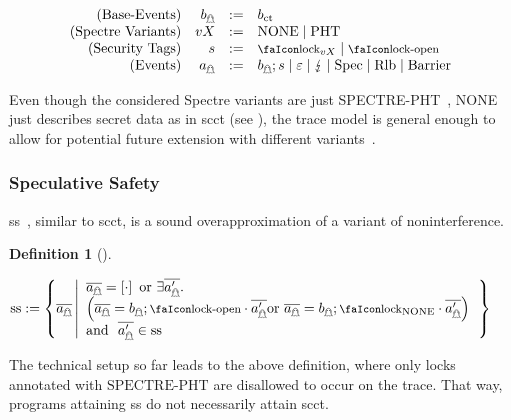 \documentclass[dvipsnames,conference]{IEEEtran}
\theoremstyle{definition}
\newtheorem{definition}{Definition}[section]
\begin{document}
\vspace{-1em}
{
\[
  \begin{array}{rrcl}
    (\text{Base-Events}) & \preevent[_{\mathghost}] &:=& \preevent[_{\ctsafe}] \\
    (\text{Spectre Variants}) & vX &:=& \operatorname{NONE} \mid \operatorname{PHT} \\
    (\text{Security Tags}) & \securitytag{} &:=& \lock_{vX} \mid \unlock\\ 
    (\text{Events}) & \event[_{\mathghost}] &:=& \preevent[_{\mathghost}];\securitytag{} \mid \emptyevent \mid \lightning \mid \ev{Spec} \mid \ev{Rlb} \mid \ev{Barrier}\\ 
  \end{array}
\]
}

Even though the considered Spectre variants are just SPECTRE-PHT~\cite{kocher2019spectre}, NONE just describes secret data as in \gls*{scct} (see ), the trace model is general enough to allow for potential future extension with different variants~\cite{kocher2019spectre,maisuradze2018ret2spec,horn2019zero}.

\subsubsection{Speculative Safety}

\gls*{ss}~\cite{patrignani2021exorcising}, similar to \gls*{scct}, is a sound overapproximation of a variant of noninterference.

\begin{definition}[]\label{def:trace:ss}
  \noindent

  \begin{nscenter}
  $
    \sssafe:=\left\{\trace[_{\mathghost}] \left|\begin{array}{l}
      \trace[_{\mathghost}]=\hole{\cdot} \text{ or } \exists\trace[_{\mathghost}'].\\
      \left(\trace[_{\mathghost}]=\preevent[_{\mathghost}];\unlock\cdot\trace[_{\mathghost}'] \text{or }\trace[_{\mathghost}]=\preevent[_{\mathghost}];\lock_{\text{NONE}}\cdot\trace[_{\mathghost}']\right)\\
      \text{and }\ \trace[_{\mathghost}']\in\sssafe
                                 \end{array}\right.\right\}
  $ 
  \end{nscenter}
\end{definition}
The technical setup so far leads to the above definition, where only locks annotated with $\text{SPECTRE-PHT}$ are disallowed to occur on the trace.
That way, programs attaining \gls*{ss} do not necessarily attain \gls*{scct}.
\end{document}
